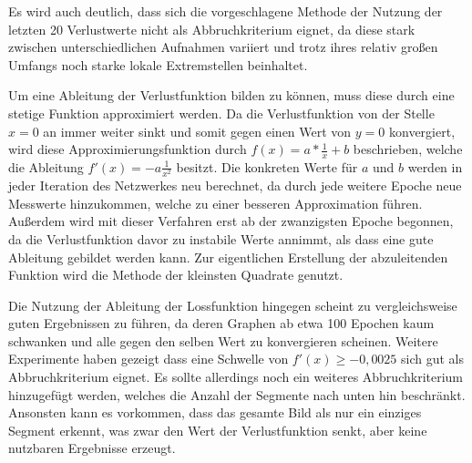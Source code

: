 Es wird auch deutlich, dass sich die vorgeschlagene Methode der Nutzung der letzten 20 Verlustwerte nicht als Abbruchkriterium eignet, da diese stark zwischen unterschiedlichen Aufnahmen variiert und trotz ihres relativ großen Umfangs noch starke lokale Extremstellen beinhaltet.

Um eine Ableitung der Verlustfunktion bilden zu können, muss diese durch eine stetige Funktion approximiert werden. Da die Verlustfunktion von der Stelle $x=0$ an immer weiter sinkt und somit gegen einen Wert von $y=0$ konvergiert, wird diese Approximierungsfunktion durch $f(x) = a*\frac{1}{x}+b$ beschrieben, welche die Ableitung $f'(x)=-a\frac{1}{x^2}$ besitzt. Die konkreten Werte für $a$ und $b$ werden in jeder Iteration des Netzwerkes neu berechnet, da durch jede weitere Epoche neue Messwerte hinzukommen, welche zu einer besseren Approximation führen. Außerdem wird mit dieser Verfahren erst ab der zwanzigsten Epoche begonnen, da die Verlustfunktion davor zu instabile Werte annimmt, als dass eine gute Ableitung gebildet werden kann. Zur eigentlichen Erstellung der abzuleitenden Funktion wird die Methode der kleinsten Quadrate genutzt.

Die Nutzung der Ableitung der Lossfunktion hingegen scheint zu vergleichsweise guten Ergebnissen zu führen, da deren Graphen ab etwa 100 Epochen kaum schwanken und alle gegen den selben Wert zu konvergieren scheinen. Weitere Experimente haben gezeigt dass eine Schwelle von $f'(x)\geq-0,0025$ sich gut als Abbruchkriterium eignet. Es sollte allerdings noch ein weiteres Abbruchkriterium hinzugefügt werden, welches die Anzahl der Segmente nach unten hin beschränkt. Ansonsten kann es vorkommen, dass das gesamte Bild als nur ein einziges Segment erkennt, was zwar den Wert der Verlustfunktion senkt, aber keine nutzbaren Ergebnisse erzeugt.

